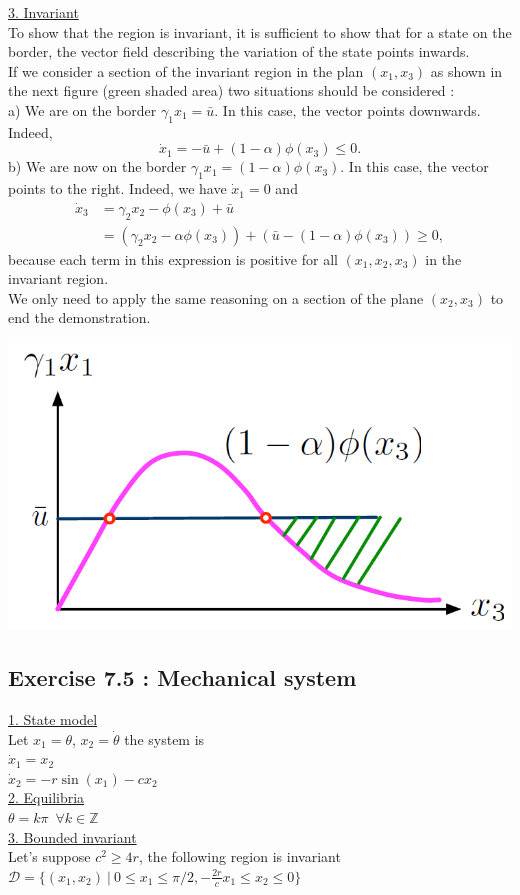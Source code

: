 \underline{3. Invariant} \\
To show that the region is invariant, it is sufficient to show that for a state on the border, the vector field describing the variation of the state points inwards. \\
If we consider a section of the invariant region in the plan $(x_1,x_3)$ as shown in the next figure (green shaded area) two situations should be considered :\\
\indent a) We are on the border $\gamma_1x_1 = \bar{u}$. In this case, the vector points downwards. Indeed, $$\dot{x}_1=-\bar{u}+(1-\alpha )\phi (x_3)\leq 0.$$
\indent b) We are now on the border $\gamma_1x_1 = (1-\alpha )\phi (x_3)$. In this case, the vector points to the right. Indeed, we have $\dot{x}_1 = 0$ and 
\begin{align*}
\dot{x}_3 &= \gamma_2x_2 - \phi (x_3) + \bar{u} \\
&= (\gamma_2x_2 - \alpha\phi (x_3)) + (\bar{u}-(1-\alpha)\phi (x_3)) \geq 0, 
\end{align*}
because each term in this expression is positive for all $(x_1,x_2,x_3)$ in the invariant region. \\
We only need to apply the same reasoning on a section of the plane $(x_2,x_3)$ to end the demonstration. 

{\centering
\includegraphics[scale=0.3]{Graphe7_3_3}
\label{Graphe7_3_3}
}

\subsection*{Exercise 7.5 : Mechanical system}
\underline{1. State model} \\
Let $x_1 = \theta $, $x_2 = \dot{\theta }$ the system is \\
\indent$ \dot{x}_1 = x_2$ \\
\indent $\dot{x}_2 = -r\sin (x_1)-cx_2 $ \\
\underline{2. Equilibria} \\
\indent$ \theta = k\pi \ \; \forall k\in \mathbb{Z} $\\
\underline{3. Bounded invariant} \\
Let's suppose $c^2 \geq 4r$, the following region is invariant \\
\indent$\mathcal{D} = \{ (x_1,x_2)\ \vert \ 0\leq x_1\leq \pi /2,-\frac{2r}{c}x_1\leq x_2\leq 0\}$